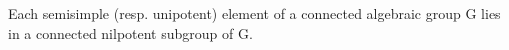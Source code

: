 Each semisimple (resp. unipotent) element of a connected algebraic group G lies in a connected nilpotent subgroup of G.
